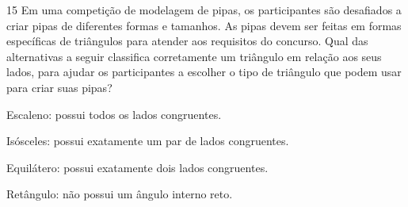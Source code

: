 

\num{15} Em uma competição de modelagem de pipas, os participantes são
desafiados a criar pipas de diferentes formas e tamanhos. As pipas devem
ser feitas em formas específicas de triângulos para atender aos requisitos
do concurso. Qual das alternativas a seguir classifica corretamente um triângulo
em relação aos seus lados, para ajudar os participantes a escolher o tipo
de triângulo que podem usar para criar suas pipas?

\begin{escolha}
\item Escaleno: possui todos os lados congruentes.

\item Isósceles: possui exatamente um par de lados congruentes.

\item Equilátero: possui exatamente dois lados congruentes.

\item Retângulo: não possui um ângulo interno reto.
\end{escolha}



%



